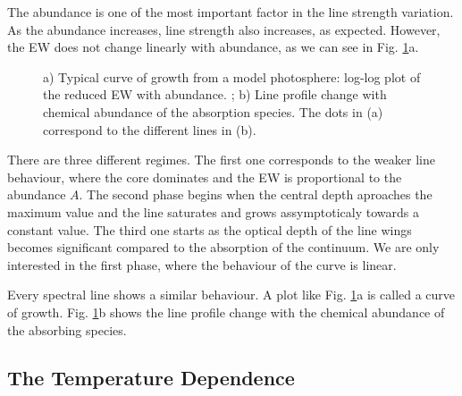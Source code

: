 \documentclass[dvips,12pt,a4paper]{report}
\begin{document}
{The abundance is one of the most important factor in the line strength variation. As the abundance increases, line strength also increases, as expected. However, the EW does not change linearly with abundance, as we can see in Fig. \ref{cog}a. 
\begin{figure}[h]
\centering
{}
\caption[EW and Profile dependence of abundance] {a) Typical curve of growth from a model photosphere: log-log plot of the reduced EW with abundance. ; b) Line profile change with chemical abundance of the absorption species. The dots in (a) correspond to the different lines in (b).}
\label{cog}
\end{figure}

There are three different regimes. The first one corresponds to the weaker line behaviour, where the core dominates and the EW is proportional to the abundance $A$. The second phase begins when the central depth aproaches the maximum value and the line saturates and grows assymptoticaly towards a constant value. The third one starts as the optical depth of the line wings becomes significant compared to the absorption of the continuum. We are only interested in the first phase, where the behaviour of the curve is linear.

Every spectral line shows a similar behaviour. A plot like Fig. \ref{cog}a is called a curve of growth. Fig. \ref{cog}b shows the line profile change with the chemical abundance of the absorbing species. 

\subsection{The Temperature Dependence}

}
\end{document}
